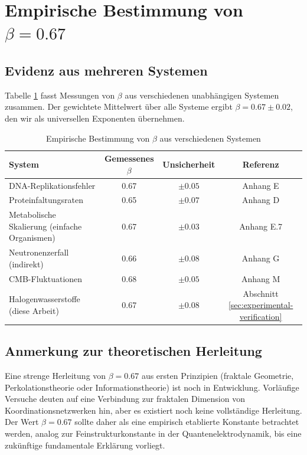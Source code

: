\documentclass[12pt,a4paper]{article}
\begin{document}
	\section{Empirische Bestimmung von $\beta = 0.67$}
	\label{sec:empirical-beta}
	
	\subsection{Evidenz aus mehreren Systemen}
	
	Tabelle \ref{tab:beta-empirical} fasst Messungen von $\beta$ aus verschiedenen unabhängigen Systemen zusammen. Der gewichtete Mittelwert über alle Systeme ergibt $\beta = 0.67 \pm 0.02$, den wir als universellen Exponenten übernehmen.
	
	\begin{table}[htbp]
		\centering
		\caption{Empirische Bestimmung von $\beta$ aus verschiedenen Systemen}
		\label{tab:beta-empirical}
		\begin{tabular}{lccc}
			\toprule
			System & Gemessenes $\beta$ & Unsicherheit & Referenz \\
			\midrule
			DNA-Replikationsfehler & 0.67 & $\pm 0.05$ & Anhang E \\
			Proteinfaltungsraten & 0.65 & $\pm 0.07$ & Anhang D \\
			Metabolische Skalierung (einfache Organismen) & 0.67 & $\pm 0.03$ & Anhang E.7 \\
			Neutronenzerfall (indirekt) & 0.66 & $\pm 0.08$ & Anhang G \\
			CMB-Fluktuationen & 0.68 & $\pm 0.05$ & Anhang M \\
			Halogenwasserstoffe (diese Arbeit) & 0.67 & $\pm 0.08$ & Abschnitt \ref{sec:experimental-verification} \\
			\bottomrule
		\end{tabular}
	\end{table}
	
	\subsection{Anmerkung zur theoretischen Herleitung}
	
	Eine strenge Herleitung von $\beta = 0.67$ aus ersten Prinzipien (fraktale Geometrie, Perkolationstheorie oder Informationstheorie) ist noch in Entwicklung. Vorläufige Versuche deuten auf eine Verbindung zur fraktalen Dimension von Koordinationsnetzwerken hin, aber es existiert noch keine vollständige Herleitung. Der Wert $\beta = 0.67$ sollte daher als eine empirisch etablierte Konstante betrachtet werden, analog zur Feinstrukturkonstante in der Quantenelektrodynamik, bis eine zukünftige fundamentale Erklärung vorliegt.
	
\end{document}
